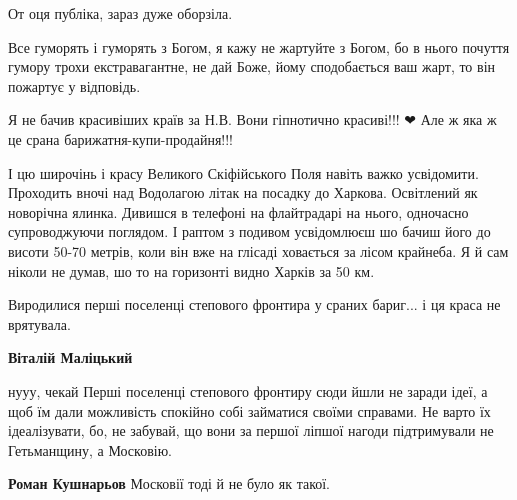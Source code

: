 \begin{itemize}
\begin{itemize}
От оця публіка, зараз дуже оборзіла.

Все гуморять і гуморять з Богом, я кажу не жартуйте з Богом, бо в нього почуття
гумору трохи екстравагантне, не дай Боже, йому сподобається ваш жарт, то він
пожартує у відповідь.

Я не бачив красивіших країв за Н.В. Вони гіпнотично красиві!!! ❤ Але ж яка ж це
срана барижатня-купи-продайня!!!

 

І цю широчінь і красу Великого Скіфійського Поля навіть важко усвідомити.
Проходить вночі над Водолагою літак на посадку до Харкова. Освітлений як
новорічна ялинка. Дивишся в телефоні на флайтрадарі на нього, одночасно
супроводжуючи поглядом. І раптом з подивом усвідомлюєш шо бачиш його до висоти
50-70 метрів, коли він вже на глісаді ховається за лісом крайнеба. Я й сам
ніколи не думав, шо то на горизонті видно Харків \Smiley[1.0][yellow] за 50 км.

Виродилися перші поселенці степового фронтира у сраних бариг... і ця краса не
врятувала.


 
\textbf{Віталій Маліцький} 

нууу, чекай \Smiley[1.0][yellow] Перші поселенці степового фронтиру сюди йшли не заради ідеї, а
щоб їм дали можливість спокійно собі займатися своїми справами. Не варто їх
ідеалізувати, бо, не забувай, що вони за першої ліпшої нагоди підтримували не
Гетьманщину, а Московію.

 
\textbf{Роман Кушнарьов} Московії тоді й не було як такої.

 

\end{itemize}
\end{itemize}
